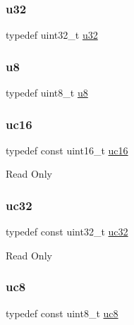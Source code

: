 \subsubsection{\texorpdfstring{u32}{u32}}
{\footnotesize\ttfamily typedef uint32\+\_\+t \mbox{\hyperlink{group___exported__types_gafaa62991928fb9fb18ff0db62a040aba}{u32}}}

\mbox{\label{group___exported__types_ga92c50087ca0e64fa93fc59402c55f8ca}} 
\subsubsection{\texorpdfstring{u8}{u8}}
{\footnotesize\ttfamily typedef uint8\+\_\+t \mbox{\hyperlink{group___exported__types_ga92c50087ca0e64fa93fc59402c55f8ca}{u8}}}

\mbox{\label{group___exported__types_gabc715ea3779494b5a4f53173a397f7cb}} 
\subsubsection{\texorpdfstring{uc16}{uc16}}
{\footnotesize\ttfamily typedef const uint16\+\_\+t \mbox{\hyperlink{group___exported__types_gabc715ea3779494b5a4f53173a397f7cb}{uc16}}}

Read Only \mbox{\label{group___exported__types_ga5b628e6a05856ff67e535fa391a57683}} 
\subsubsection{\texorpdfstring{uc32}{uc32}}
{\footnotesize\ttfamily typedef const uint32\+\_\+t \mbox{\hyperlink{group___exported__types_ga5b628e6a05856ff67e535fa391a57683}{uc32}}}

Read Only \mbox{\label{group___exported__types_gac74022c74a461f810e0d4fdc9bfea480}} 
\subsubsection{\texorpdfstring{uc8}{uc8}}
{\footnotesize\ttfamily typedef const uint8\+\_\+t \mbox{\hyperlink{group___exported__types_gac74022c74a461f810e0d4fdc9bfea480}{uc8}}}


